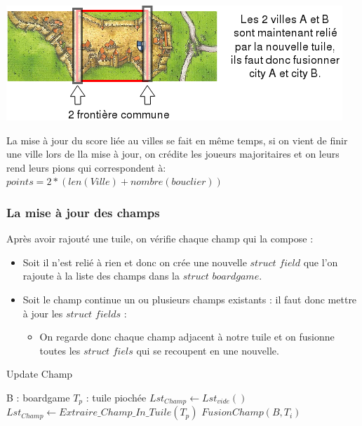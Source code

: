 \vspace{1cm}

\includegraphics[scale=1]{villeModif1.png}

\vspace{1cm}

La mise à jour du score liée au villes se fait en même temps, si on vient de finir une ville lors de lla mise à jour, on crédite les joueurs majoritaires et on leurs rend leurs pions qui correspondent à: $points = 2 * ( len(Ville) + nombre(bouclier) )$


\subsubsection{La mise à jour des champs}
Après avoir rajouté une tuile, on vérifie chaque champ qui la compose :
\begin{itemize}
    \item Soit il n'est relié à rien et donc on crée une nouvelle $struct$ $field$ que l'on rajoute à la liste des champs dans la $struct$ $boardgame$.
    \item Soit le champ continue un ou plusieurs champs existants : il faut donc mettre à jour les $struct$ $fields$ :
    \begin{itemize}
        \item On regarde donc chaque champ adjacent à notre tuile et on fusionne toutes les $struct$ $fiels$ qui se recoupent en une nouvelle.
    \end{itemize}
\end{itemize}



\begin{algorithm}[!h]
\caption{Update Champ}
\begin{algorithmic} [!h]
\REQUIRE  B : boardgame
\REQUIRE  $T_p $ : tuile piochée
\STATE $Lst_{Champ} \leftarrow Lst_{vide}()$
\STATE $Lst_{Champ} \leftarrow Extraire\_Champ\_In\_Tuile(T_p)$
\STATE $FusionChamp(B,T_i)$
\ENDFOR
\end{algorithmic}
\end{algorithm}

